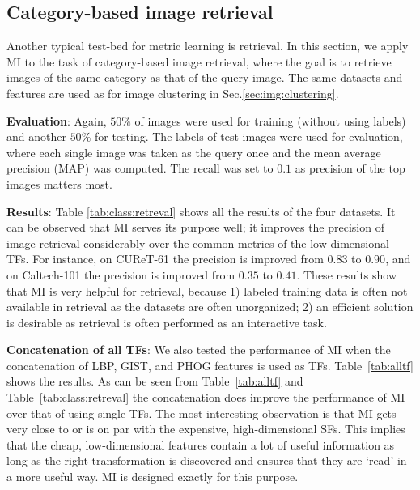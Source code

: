 \documentclass[10pt,twocolumn,letterpaper]{article}
\begin{document}

\subsection{Category-based image retrieval}

Another typical test-bed for metric learning is retrieval. In this
section, we apply MI to the task of category-based image retrieval,
where the goal is to retrieve images of the same category as that 
of the query image. The same datasets and features are used as for
image clustering in Sec.\ref{sec:img:clustering}.

\textbf{Evaluation}: Again, $50\%$ of images were used for training
(without using labels) and another $50\%$ for testing. The labels of
test images were used for evaluation, where each single image was
taken as the query once and the mean average precision (MAP) was
computed. The recall was set to $0.1$ as precision of the top images
matters most.


\textbf{Results}: Table \ref{tab:class:retreval} shows all the results
of the four datasets. It can be observed that MI
serves its purpose well; it improves the precision of image retrieval
considerably over the common metrics of the low-dimensional TFs. 
For instance, on CUReT-61 the precision is improved from
$0.83$ to $0.90$, and on Caltech-101 the precision is improved from
$0.35$ to $0.41$.  These results show that MI is very helpful for
retrieval, because 1) labeled training data is often not available in
retrieval as the datasets are often unorganized; 2) an efficient
solution is desirable as retrieval is often performed as an interactive
task.

\textbf{Concatenation of all TFs}: We also tested the performance of
MI when the concatenation of LBP, GIST, and PHOG features is used as 
TFs. Table~\ref{tab:alltf} shows the results. As can be seen from
Table~\ref{tab:alltf} and Table~\ref{tab:class:retreval} the 
concatenation does improve the performance of MI over that of using 
single TFs. The most interesting observation is that MI gets very close
to or is on par with the expensive, high-dimensional SFs. This implies
that the cheap, low-dimensional features contain a lot of useful
information as long as the right transformation is discovered and
ensures that they are `read' in a more useful way. MI is designed 
exactly for this purpose. 
\end{document}
